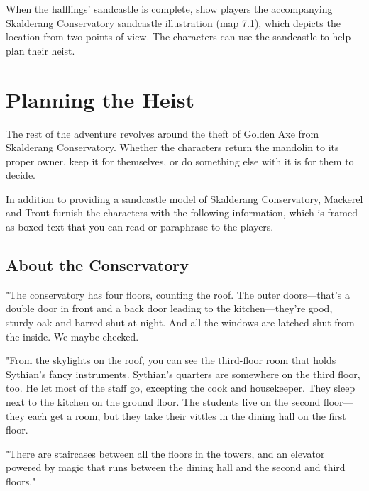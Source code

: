 \documentclass[10pt,a4paper,twoside,bg=print,twocolumn,openany,nodeprecatedcode]{dndbook}
\begin{document}
When the halflings' sandcastle is complete, show players the accompanying Skalderang Conservatory sandcastle illustration (map 7.1), which depicts the location from two points of view. The characters can use the sandcastle to help plan their heist.

\section{Planning the Heist}
The rest of the adventure revolves around the theft of Golden Axe from Skalderang Conservatory. Whether the characters return the mandolin to its proper owner, keep it for themselves, or do something else with it is for them to decide.

In addition to providing a sandcastle model of Skalderang Conservatory, Mackerel and Trout furnish the characters with the following information, which is framed as boxed text that you can read or paraphrase to the players.

\subsection{About the Conservatory}
\begin{DndReadAloud}{}
"The conservatory has four floors, counting the roof. The outer doors—that's a double door in front and a back door leading to the kitchen—they're good, sturdy oak and barred shut at night. And all the windows are latched shut from the inside. We maybe checked.

"From the skylights on the roof, you can see the third-floor room that holds Sythian's fancy instruments. Sythian's quarters are somewhere on the third floor, too. He let most of the staff go, excepting the cook and housekeeper. They sleep next to the kitchen on the ground floor. The students live on the second floor—they each get a room, but they take their vittles in the dining hall on the first floor.

"There are staircases between all the floors in the towers, and an elevator powered by magic that runs between the dining hall and the second and third floors."

\end{DndReadAloud}
\end{document}
